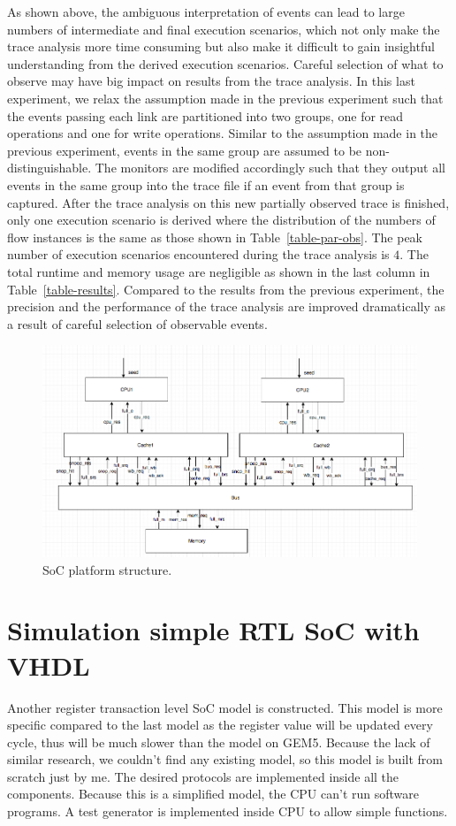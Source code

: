\documentclass[12pt,frontmatter,copyright,thesis]{usfmanus}
\begin{document}
As shown above, the ambiguous interpretation of events can lead to large numbers of intermediate and final execution scenarios, which not only make the trace analysis more time consuming but also make it difficult to gain insightful understanding from the derived execution scenarios.  Careful selection of what to observe may have big impact on results from the trace analysis.  In this last experiment, we relax the assumption made in the previous experiment such that the events passing each link are partitioned into two groups, one for read operations and one for write operations.  Similar to the assumption made in the previous experiment, events in the same group are assumed to be non-distinguishable.  The monitors are modified accordingly such that they output all events in the same group into the trace file if an event from that group is captured.  After the trace analysis on this new partially observed trace is finished, only one execution scenario is derived where the distribution of the numbers of flow instances is the same as those shown in Table~\ref{table-par-obs}.  The peak number of execution scenarios encountered during the trace analysis is $4$.  The total runtime and memory usage are negligible as shown in the last column in Table~\ref{table-results}.  Compared to the results from the previous experiment, the precision and the performance of the trace analysis are improved dramatically as a result of careful selection of observable events. 


\begin{figure} 
\centerline{
\includegraphics[width=7in]{struc.pdf}}
\caption{SoC platform structure.}
\label{rtlstruc}
\end{figure}


\section{Simulation simple RTL SoC with VHDL}
Another register transaction level SoC model is constructed. This model is more specific compared to the last model as the register value will be updated every cycle, thus will be much slower than the model on GEM5. Because the lack of similar research, we couldn't find any existing model, so this model is built from scratch just by me. The desired protocols are implemented inside all the components. Because this is a simplified model, the CPU can't run software programs. A test generator is implemented inside CPU to allow simple functions.
\end{document}
